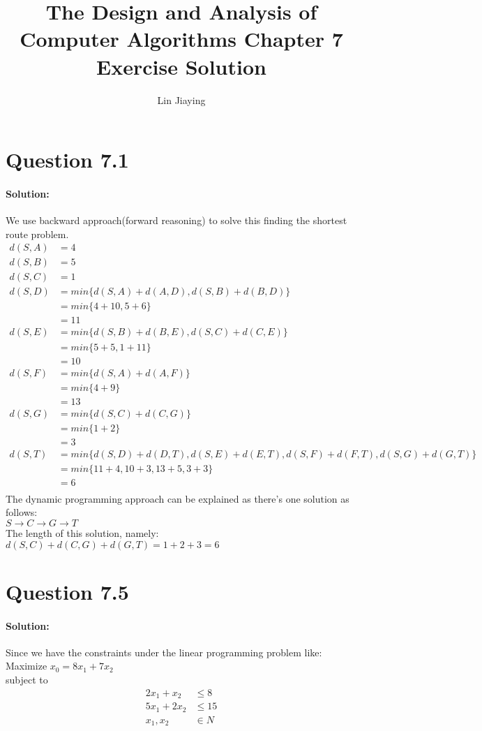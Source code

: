 \documentclass{article}
\author{Lin Jiaying}
\title{The Design and Analysis of Computer Algorithms
Chapter 7 Exercise Solution}
\begin{document}
	\maketitle
	\section{Question 7.1}
	\paragraph{Solution:}
	We use backward approach(forward reasoning) to solve this finding the shortest route problem.\\
	\begin{align*}
	d(S, A) &= 4\\
	d(S, B) &= 5\\
	d(S, C) &= 1\\
	d(S, D) &= min\{d(S, A) + d(A, D), d(S, B) + d(B, D)\} \\
		    &= min\{4 + 10, 5 + 6\} \\
		    &= 11\\
	d(S, E) &= min\{d(S, B) + d(B, E), d(S, C) + d(C, E)\} \\
	&= min\{5 + 5, 1 + 11\}\\
	&= 10\\
	d(S, F) &= min\{d(S, A) + d(A, F)\}\\
	&= min\{4 + 9\}\\
	&= 13\\
	d(S, G) &= min\{d(S, C) + d(C, G)\}\\
	&= min\{1 + 2\}\\
	&= 3\\
	d(S, T) &= min\{d(S, D) + d(D, T), d(S, E) + d(E, T), d(S, F) + d(F, T), d(S, G) + d(G, T)\}\\
	&= min\{11 + 4, 10 + 3, 13 + 5, 3 + 3\}\\
	&= 6\\
	\end{align*}
	The dynamic programming approach can be explained as there's one solution as follows:\\
	$S \to C \to G \to T$\\
	The length of this solution, namely:\\
	$d(S, C) + d(C , G) + d(G, T) =  1 + 2 + 3 = 6$
	\section{Question 7.5}
	\paragraph{Solution:}
	Since we have the constraints under the linear programming problem like:\\
	Maximize $x_0 = 8x_1+7x_2$\\
	subject to\\
	\begin{align}
	 2x_1 + x_2 &\leq 8 \\
5x_1 + 2x_2 &\leq 15\\
x_1, x_2 &\in N
	\end{align}
\end{document}
